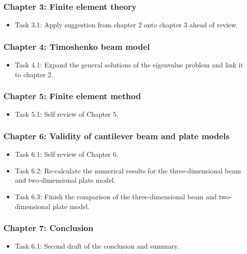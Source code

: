 \documentclass[12pt, a4paper]{article}
\begin{document}
\subsubsection*{Chapter 3: Finite element theory}
\begin{itemize}[label=\Square]
  \item Task 3.1: Apply suggestion from chapter 2 onto chapter 3 ahead of review.
\end{itemize}

\subsubsection*{Chapter 4: Timoshenko beam model}
\begin{itemize}[label=\Square]
  \item Task 4.1: Expand the general solutions of the eigenvalue problem and link it to chapter 2.
\end{itemize}

\subsubsection*{Chapter 5: Finite element method}
\begin{itemize}[label=\Square]
  \item Task 5.1: Self review of Chapter 5.
\end{itemize}

\subsubsection*{Chapter 6: Validity of cantilever beam and plate models}
\begin{itemize}[label=\Square]
  \item Task 6.1: Self review of Chapter 6.
  \item Task 6.2: Re-calculate the numerical results for the three-dimensional beam and two-dimensional plate model.
  \item Task 6.3: Finish the comparison of the three-dimensional beam and two-dimensional plate model.
\end{itemize}

\subsubsection*{Chapter 7: Conclusion}
\begin{itemize}[label=\Square]
  \item Task 6.1: Second draft of the conclusion and summary.
\end{itemize}
\end{document}
